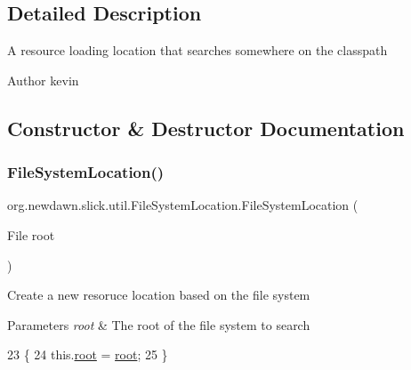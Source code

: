 \subsection{Detailed Description}
A resource loading location that searches somewhere on the classpath

\begin{DoxyAuthor}{Author}
kevin 
\end{DoxyAuthor}


\subsection{Constructor \& Destructor Documentation}
\mbox{\label{classorg_1_1newdawn_1_1slick_1_1util_1_1_file_system_location_aa21c8d2fe37743d92736667a8efc98da}} 
\subsubsection{\texorpdfstring{File\+System\+Location()}{FileSystemLocation()}}
{\footnotesize\ttfamily org.\+newdawn.\+slick.\+util.\+File\+System\+Location.\+File\+System\+Location (\begin{DoxyParamCaption}\item[{File}]{root }\end{DoxyParamCaption})\hspace{0.3cm}{\ttfamily [inline]}}

Create a new resoruce location based on the file system


\begin{DoxyParams}{Parameters}
{\em root} & The root of the file system to search \\
\hline
\end{DoxyParams}

\begin{DoxyCode}
23                                          \{
24         this.\mbox{\hyperlink{classorg_1_1newdawn_1_1slick_1_1util_1_1_file_system_location_a63b136315b940762412adc61596fb6cf}{root}} = \mbox{\hyperlink{classorg_1_1newdawn_1_1slick_1_1util_1_1_file_system_location_a63b136315b940762412adc61596fb6cf}{root}};
25     \}
\end{DoxyCode}


